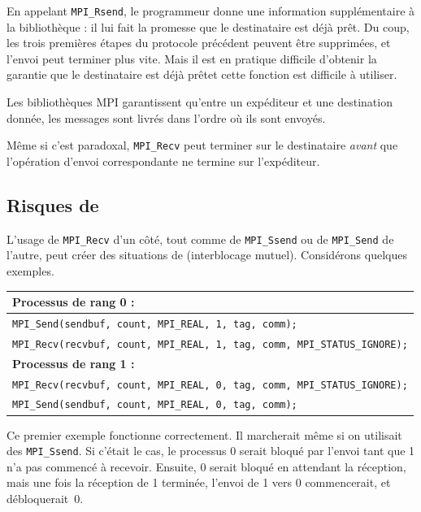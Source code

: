 En appelant \texttt{MPI\_Rsend}, le programmeur donne une information
supplémentaire à la bibliothèque : il lui fait la promesse que le destinataire
est déjà prêt. Du coup, les trois premières étapes du protocole précédent
peuvent être supprimées, et l'envoi peut terminer plus vite. Mais il est en
pratique difficile d'obtenir la garantie que le destinataire est \og déjà
prêt\fg et cette fonction est difficile à utiliser.

Les bibliothèques MPI garantissent qu'entre un expéditeur et une
destination donnée, les messages sont livrés dans l'ordre où ils sont
envoyés.

Même si c'est paradoxal, \texttt{MPI\_Recv} peut terminer sur le
destinataire \emph{avant} que l'opération d'envoi correspondante ne
termine sur l'expéditeur.

\subsection{Risques de }

L'usage de \texttt{MPI\_Recv} d'un côté, tout comme de \texttt{MPI\_Ssend} ou de
\texttt{MPI\_Send} de l'autre, peut créer des situations de 
(\og interblocage mutuel\fg). Considérons quelques exemples.

\begin{tabular}{|l|}
  \hline
  \textbf{Processus de rang 0 :} \\
  \hline
  \texttt{MPI_Send(sendbuf, count, MPI_REAL, 1, tag, comm);} \\
  \texttt{MPI_Recv(recvbuf, count, MPI_REAL, 1, tag, comm, MPI_STATUS_IGNORE);} \\
\hline
\hline
\textbf{Processus de rang 1 :} \\
  \hline
  \texttt{MPI_Recv(recvbuf, count, MPI_REAL, 0, tag, comm, MPI_STATUS_IGNORE);} \\
  \texttt{MPI_Send(sendbuf, count, MPI_REAL, 0, tag, comm);} \\
\hline
\end{tabular}

Ce premier exemple fonctionne correctement. Il marcherait même si on utilisait des
\verb|MPI_Ssend|. Si c'était le cas, le processus 0 serait bloqué par l'envoi
tant que 1 n'a pas commencé à recevoir. Ensuite, 0 serait bloqué en attendant la
réception, mais une fois la réception de 1 terminée, l'envoi de 1 vers 0
commencerait, et débloquerait~0.

\bigskip

